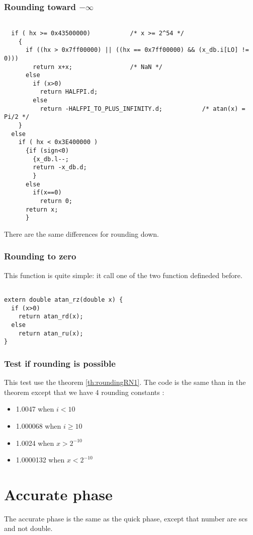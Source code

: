 \subsubsection{Rounding toward $-\infty$}

\begin{lstlisting}[caption={Exceptional cases : rounding up},firstnumber=1]

  if ( hx >= 0x43500000)           /* x >= 2^54 */
    {
      if ((hx > 0x7ff00000) || ((hx == 0x7ff00000) && (x_db.i[LO] != 0)))
        return x+x;                /* NaN */
      else
        if (x>0)
          return HALFPI.d;
        else
          return -HALFPI_TO_PLUS_INFINITY.d;           /* atan(x) = Pi/2 */
    }
  else
    if ( hx < 0x3E400000 )
      {if (sign<0)
        {x_db.l--;
        return -x_db.d;
        }
      else
        if(x==0)
          return 0;
      return x;
      }

\end{lstlisting}

There are the same differences for rounding down.

\subsubsection{Rounding to zero}

This function is quite simple: it call one of the two function defineded
before.

\begin{lstlisting}[caption={Rounding to zero},firstnumber=1]

extern double atan_rz(double x) {
  if (x>0)
    return atan_rd(x);
  else
    return atan_ru(x);
}
\end{lstlisting}

\subsubsection{Test if rounding is possible}
This test use the theorem \ref{th:roundingRN1}.
The code is the same than in the theorem except that we have 4 rounding
constants : 
\begin{itemize}
\item 1.0047 when $i<10$
\item 1.000068 when $i\geq10$
\item 1.0024 when $x>2^{-10}$
\item 1.0000132 when $x<2^{-10}$
\end{itemize}


\section{Accurate phase}
The accurate phase is the same as the quick phase, except that number are
scs and not double.

